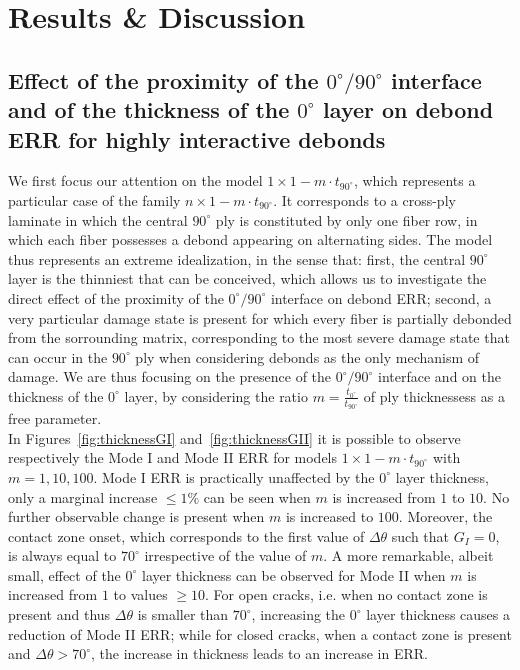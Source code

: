 \documentclass[review]{elsarticle}
\begin{document}

\section{Results \& Discussion}

\subsection{Effect of the proximity of the $0^{\circ}/90^{\circ}$ interface and of the thickness of the $0^{\circ}$ layer on debond ERR for highly interactive debonds}\label{subsec:thickness}

We first focus our attention on the model $1\times 1-m\cdot t_{90^{\circ}}$, which represents a particular case of the family $n\times 1-m\cdot t_{90^{\circ}}$. It corresponds to a cross-ply laminate in which the central $90^{\circ}$ ply is constituted by only one fiber row, in which each fiber possesses a debond appearing on alternating sides. The model thus represents an extreme idealization, in the sense that: first, the central $90^{\circ}$ layer is the thinniest that can be conceived, which allows us to investigate the direct effect of the proximity of the $0^{\circ}/90^{\circ}$ interface on debond ERR; second, a very particular damage state is present for which every fiber is partially debonded from the sorrounding matrix, corresponding to the most severe damage state that can occur in the $90^{\circ}$ ply when considering debonds as the only mechanism of damage. We are thus focusing on the presence of the $0^{\circ}/90^{\circ}$ interface and on the thickness of the $0^{\circ}$ layer, by considering the ratio $m=\frac{t_{0^{\circ}}}{t_{90^{\circ}}}$ of ply thicknessess as a free parameter.\\
In Figures~\ref{fig:thicknessGI} and~\ref{fig:thicknessGII} it is possible to observe respectively the Mode I and Mode II ERR for models $1\times 1-m\cdot t_{90^{\circ}}$ with $m=1,10,100$. Mode I ERR is practically unaffected by the $0^{\circ}$ layer thickness, only a marginal increase $\leq1\%$ can be seen when $m$ is increased from $1$ to $10$. No further observable change is present when $m$ is increased to $100$. Moreover, the contact zone onset, which corresponds to the first value of $\Delta\theta$ such that $G_{I}=0$, is always equal to $70^{\circ}$ irrespective of the value of $m$. A more remarkable, albeit small, effect of the $0^{\circ}$ layer thickness can be observed for Mode II when $m$ is increased from $1$ to values $\geq10$. For open cracks, i.e. when no contact zone is present and thus $\Delta\theta$ is smaller than $70^{\circ}$, increasing the $0^{\circ}$ layer thickness causes a reduction of Mode II ERR; while for closed cracks, when a contact zone is present and $\Delta\theta>70^{\circ}$, the increase in thickness leads to an increase in ERR.\\
\end{document}
